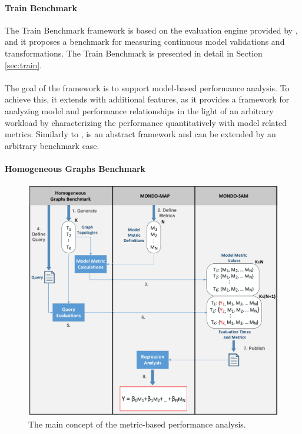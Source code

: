 \paragraph{Train Benchmark}
The Train Benchmark framework is based on the evaluation engine provided by \sam, and it proposes a benchmark for measuring continuous model validations and transformations. The Train Benchmark is presented in detail in Section \ref{sec:train}.

\paragraph{\framework}
The goal of the \map framework is to support model-based performance analysis. To achieve this, it extends \sam with additional features, as it provides a framework for analyzing model and performance relationships in the light of an arbitrary workload by characterizing the performance quantitatively with model related metrics. Similarly to \sam, \map is an abstract framework and can be extended by an arbitrary benchmark case.

\paragraph{Homogeneous Graphs Benchmark}

\begin{figure}[!ht]
	\centering
	\includegraphics[width=140mm, keepaspectratio]{figures/approach.pdf}
	\caption{The main concept of the metric-based performance analysis.}
	\label{fig:approach}
\end{figure}

